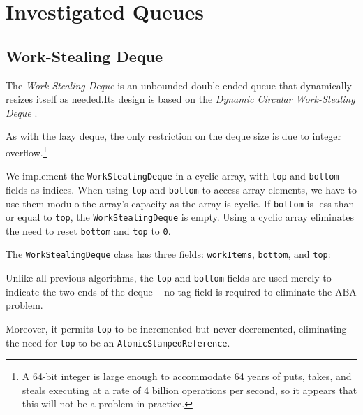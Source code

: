
\chapter{Investigated Queues}
\label{chap:queues-implementation}

\section{Work-Stealing Deque}
\label{sec:queues-implementation-ws-deque}

The \emph{Work-Stealing Deque} is an unbounded double-ended queue that
dynamically resizes itself as needed.Its design is based on the
\emph{Dynamic Circular Work-Stealing Deque} \cite{Chase2005, Lev2005}.

As with the lazy deque, the only restriction on the deque size is due
to integer overflow.\footnote{A 64-bit integer is large enough to
  accommodate 64 years of puts, takes, and steals executing at a rate
  of 4 billion operations per second, so it appears that this will not
  be a problem in practice.}

We implement the \lstinline!WorkStealingDeque! in a cyclic array, with
\lstinline!top! and \lstinline!bottom! fields as indices. When using
\lstinline!top! and \lstinline!bottom! to access array elements, we
have to use them modulo the array's capacity as the array is
cyclic. If \lstinline!bottom! is less than or equal to
\lstinline!top!, the \lstinline!WorkStealingDeque! is empty. Using a
cyclic array eliminates the need to reset \lstinline!bottom! and
\lstinline!top! to \lstinline!0!. 

The \lstinline!WorkStealingDeque! class has three fields:
\lstinline!workItems!, \lstinline!bottom!, and \lstinline!top!:



Unlike all previous algorithms, the \lstinline!top! and
\lstinline!bottom! fields are used merely to indicate the two ends of
the deque -- no tag field is required to eliminate the ABA problem.

Moreover, it permits \lstinline!top!  to be incremented but never
decremented, eliminating the need for \lstinline!top! to be an
\lstinline!AtomicStampedReference!.


